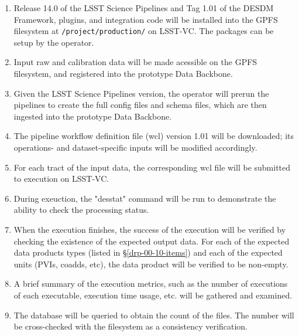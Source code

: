 \begin{enumerate}

  \item{Release 14.0 of the LSST Science Pipelines and Tag 1.01 of the DESDM Framework, plugins, and integration code will be installed into the GPFS filesystem at \texttt{/project/production/} on LSST-VC. The packages can be setup by the operator.}
  \item{Input raw and calibration data will be made acessible on the GPFS filesystem, and registered into the prototype Data Backbone.}
  \item{Given the LSST Science Pipelines version, the operator will prerun the pipelines to create the full config files and schema files, which are then ingested into the prototype Data Backbone.}
  \item{The pipeline workflow definition file (wcl) version 1.01 will be downloaded; its operations- and dataset-specific inputs will be modified accordingly.}
  \item{For each tract of the input data, the corresponding wcl file will be submitted to execution on LSST-VC.}
  \item{During exeuction, the "desstat" command will be run to demonstrate the ability to check the processing status.}
  \item{When the execution finishes, the success of the execution will be verified by checking the existence of the expected output data.
  For each of the expected data products types (listed in \S\ref{drp-00-10-items})
  and each of the expected units (PVIs, coadds, etc), the data product will be
  verified to be non-empty.}
  \item{A brief summary of the execution metrics, such as the number of executions of each executable, execution time usage, etc. will be gathered and examined.}
  \item{The database will be queried to obtain the count of the files. The number will be cross-checked with the filesystem as a consistency verification.}

\end{enumerate}
